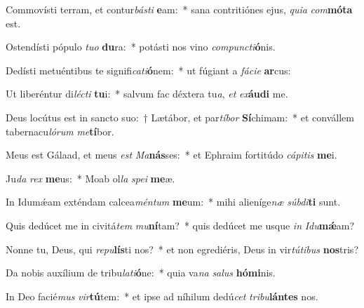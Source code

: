 \item Commovísti terram, et contur\textit{bás}\textit{ti} \textbf{e}am:~* sana contritiónes ejus, \textit{qui}\textit{a} \textit{com}\textbf{mó}\textbf{ta} est.
\item Ostendísti pópulo \textit{tu}\textit{o} \textbf{du}ra:~* potásti nos vino \textit{com}\textit{punc}\textit{ti}\textbf{ó}nis.
\item Dedísti metuéntibus te signifi\textit{ca}\textit{ti}\textbf{ó}nem:~* ut fúgiant a \textit{fá}\textit{ci}\textit{e} \textbf{ar}cus:
\item Ut liberéntur di\textit{léc}\textit{ti} \textbf{tu}i:~* salvum fac déxtera tu\textit{a}, \textit{et} \textit{ex}\textbf{áu}\textbf{di} me.
\item Deus locútus est in sancto suo:~† Lætábor, et par\textit{tí}\textit{bor} \textbf{Sí}chimam:~* et convállem tabernacu\textit{ló}\textit{rum} \textit{me}\textbf{tí}bor.
\item Meus est Gálaad, et meus \textit{est} \textit{Ma}\textbf{nás}ses:~* et Ephraim fortitúdo \textit{cá}\textit{pi}\textit{tis} \textbf{me}i.
\item Ju\textit{da} \textit{rex} \textbf{me}us:~* Moab ol\textit{la} \textit{spe}\textit{i} \textbf{me}æ.
\item In Idumǽam exténdam calcea\textit{mén}\textit{tum} \textbf{me}um:~* mihi alieníge\textit{næ} \textit{súb}\textit{di}\textbf{ti} sunt.
\item Quis dedúcet me in civitá\textit{tem} \textit{mu}\textbf{ní}tam?~* quis dedúcet me usque \textit{in} \textit{I}\textit{du}\textbf{mǽ}am?
\item Nonne tu, Deus, qui \textit{re}\textit{pu}\textbf{lís}ti nos?~* et non egrediéris, Deus in vir\textit{tú}\textit{ti}\textit{bus} \textbf{nos}tris?
\item Da nobis auxílium de tribu\textit{la}\textit{ti}\textbf{ó}ne:~* quia va\textit{na} \textit{sa}\textit{lus} \textbf{hó}\textbf{mi}nis.
\item In Deo facié\textit{mus} \textit{vir}\textbf{tú}tem:~* et ipse ad níhilum dedú\textit{cet} \textit{tri}\textit{bu}\textbf{lán}\textbf{tes} nos.
